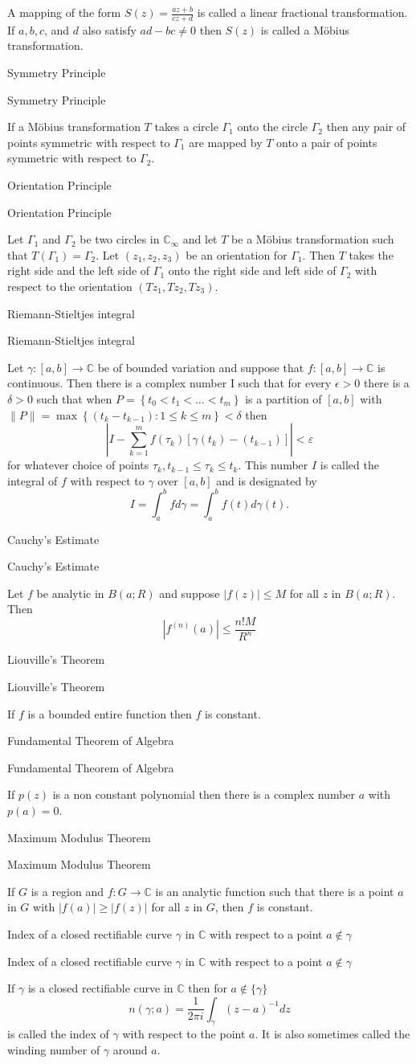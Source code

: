 \documentclass[17pt]{extarticle}
\renewcommand{\C}{\mathbb{C}}
\newcommand{\abs}[1]{\left\vert#1\right\vert}
\newcommand{\LP}{\left(}
\newcommand{\RP}{\right)}
\newcommand{\LB}{\left[}
\newcommand{\RB}{\right]}
\newcommand{\boxset}[2]{\begin{mdframed}[style=darkQuesion]
#1
\end{mdframed}
\newpage
\begin{mdframed}[style=darkQuesion]
  #1
    \end{mdframed}
\begin{mdframed}[style=darkAnswer]
  #2
    \end{mdframed}
    \newpage
}
\begin{document}
{ A mapping of the form $S(z)=\frac{a z+b}{c z+d}$ is called a linear fractional transformation. If $a, b, c$, and $d$ also satisfy $a d-b c \neq 0$ then $S(z)$ is called a Möbius transformation.}
\boxset{Symmetry Principle }
{ If a Möbius transformation $T$ takes a circle $\Gamma_{1}$ onto the circle $\Gamma_{2}$ then any pair of points symmetric with respect to $\Gamma_{1}$ are mapped by $T$ onto a pair of points symmetric with respect to $\Gamma_{2}$.}
\boxset{Orientation Principle }
{ Let $\Gamma_{1}$ and $\Gamma_{2}$ be two circles in $\C_{\infty}$ and let $T$ be a Möbius transformation such that $T\left(\Gamma_{1}\right)=\Gamma_{2}$. Let $\left(z_{1}, z_{2}, z_{3}\right)$ be an orientation for $\Gamma_{1}$. Then $T$ takes the right side and the left side of $\Gamma_{1}$ onto the right side and left side of $\Gamma_{2}$ with respect to the orientation $\left(T z_{1}, T z_{2}, T z_{3}\right)$.}
\boxset{Riemann-Stieltjes integral }
{ Let $\gamma:[a, b] \rightarrow \C$ be of bounded variation and suppose that $f:[a, b] \rightarrow \C$ is continuous. Then there is a complex number I such that for every $\epsilon>0$ there is a $\delta>0$ such that when $P=\left\{t_{0}<t_{1}<\ldots<t_{m}\right\}$ is a partition of $[a, b]$ with $\|P\|=\max \left\{\left(t_{k}-t_{k-1}\right): 1 \leq k \leq m\right\}<\delta$ then \[\abs{I-\sum_{k=1}^m f\LP\tau_k\RP\LB\gamma\LP t_k\RP-\LP t_{k-1}\RP\RB}<\varepsilon\] for whatever choice of points $\tau_{k}, t_{k-1} \leq \tau_{k} \leq t_{k}$. This number $I$ is called the integral of $f$ with respect to $\gamma$ over $[a, b]$ and is designated by \[I=\int_{a}^{b} f d \gamma=\int_{a}^{b} f(t) d \gamma(t) .\] }
\boxset{Cauchy's Estimate }
{ Let $f$ be analytic in $B(a ; R)$ and suppose $|f(z)| \leq M$ for all $z$ in $B(a ; R)$. Then \[\left|f^{(n)}(a)\right| \leq \frac{n ! M}{R^{n}}\] }
\boxset{Liouville's Theorem }
{ If $f$ is a bounded entire function then $f$ is constant.}
\boxset{Fundamental Theorem of Algebra }
{ If $p(z)$ is a non constant polynomial then there is a complex number $a$ with $p(a)=0$.}
\boxset{Maximum Modulus Theorem }
{ If $G$ is a region and $f: G \rightarrow \C$ is an analytic function such that there is a point $a$ in $G$ with $|f(a)| \geq|f(z)|$ for all $z$ in $G$, then $f$ is constant.}
\boxset{Index of a closed rectifiable curve $\gamma$ in $\C$ with respect to a point $a \notin \gamma$ }
{ If $\gamma$ is a closed rectifiable curve in $\C$ then for $a \notin\{\gamma\}$ \[n(\gamma ; a)=\frac{1}{2 \pi i} \int_{\gamma}(z-a)^{-1} d z\]  is called the index of $\gamma$ with respect to the point $a$. It is also sometimes called the winding number of $\gamma$ around $a$.}
\end{document}
